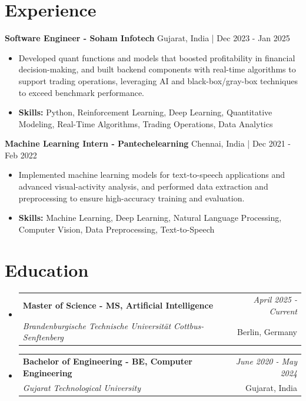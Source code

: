 \documentclass[a4paper,11pt]{article}
\makeatletter
\newcommand{\resumeSubheading}[4]{
\vspace{0.5mm}\item
    \begin{tabular*}{\linewidth}[t]{l@{\extracolsep{\fill}}r}
        \textbf{#1} & \textit{\footnotesize{#4}} \\
        \textit{\footnotesize{#3}} &  \footnotesize{#2}\\
    \end{tabular*}
    \vspace{-2.4mm}
}
\makeatother
\begin{document}
\section{\textbf{Experience}}


\vspace{1mm}
  \textbf{Software Engineer - Soham Infotech} \hfill Gujarat, India | Dec 2023 - Jan 2025
\vspace{-1.5mm} %
\begin{itemize}
  \item Developed quant functions and models that boosted profitability in financial decision-making, and built backend components with real-time algorithms to support trading operations, leveraging AI and black-box/gray-box techniques to exceed benchmark performance.

\vspace{-2mm}
  \item \textbf{Skills:} Python, Reinforcement Learning, Deep Learning, Quantitative Modeling, Real-Time Algorithms, Trading Operations, Data Analytics
\end{itemize}

\vspace{1mm}
  \textbf{Machine Learning Intern - Pantechelearning} \hfill Chennai, India | Dec 2021 - Feb 2022
\vspace{-1.5mm} %
\begin{itemize}
  \item Implemented machine learning models for text-to-speech applications and advanced visual-activity analysis, and performed data extraction and preprocessing to ensure high-accuracy training and evaluation.
\vspace{-2mm}
  \item \textbf{Skills:} Machine Learning, Deep Learning, Natural Language Processing, Computer Vision, Data Preprocessing, Text-to-Speech
\end{itemize}\section{\textbf{Education}}
\vspace{-0.4mm}

\begin{itemize}[leftmargin=0.15in, label={}]
\resumeSubheading
{Master of Science - MS, Artificial Intelligence }{Berlin, Germany}
{Brandenburgische Technische Universität Cottbus-Senftenberg  }{April 2025 - Current}

\vspace{1.0mm} %
\resumeSubheading
{Bachelor of Engineering - BE, Computer Engineering  }{Gujarat, India}
{Gujarat Technological University }{June 2020 - May 2024}

\end{itemize}
\end{document}
